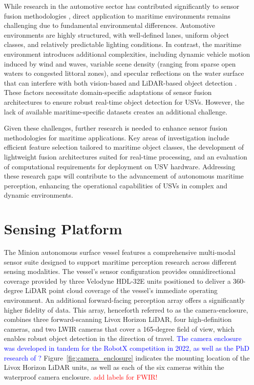 \documentclass{erauthesis}
\begin{document}
While research in the automotive sector has contributed significantly to sensor fusion methodologies \cite{yeong2021,clunie2021,roriz2022,cui2022,das2022,liu2023a}, direct application to maritime environments remains challenging due to fundamental environmental differences. 
Automotive environments are highly structured, with well-defined lanes, uniform object classes, and relatively predictable lighting conditions. 
In contrast, the maritime environment introduces additional complexities, including dynamic vehicle motion induced by wind and waves, variable scene density (ranging from sparse open waters to congested littoral zones), and specular reflections on the water surface that can interfere with both vision-based \cite{liu2023a} and \ac{LiDAR}-based object detection \cite{ahmed2024}.%
These factors necessitate domain-specific adaptations of sensor fusion architectures to ensure robust real-time object detection for \acp{USV}. 
However, the lack of available maritime-specific datasets \cite{jun-hwa2022,su2023,thompson2023} creates an additional challenge.

Given these challenges, further research is needed to enhance sensor fusion methodologies for maritime applications. 
Key areas of investigation include efficient feature selection tailored to maritime object classes, the development of lightweight fusion architectures suited for real-time processing, and an evaluation of computational requirements for deployment on \ac{USV} hardware. 
Addressing these research gaps will contribute to the advancement of autonomous maritime perception, enhancing the operational capabilities of \acp{USV} in complex and dynamic environments.

\chapter{Sensing Platform}


The Minion autonomous surface vessel features a comprehensive multi-modal sensor suite designed to support maritime perception research across different sensing modalities.
The vessel's sensor configuration provides omnidirectional coverage provided by three Velodyne HDL-32E units positioned to deliver a 360-degree \ac{LiDAR} point cloud coverage of the vessel's immediate operating environment.
An additional forward-facing perception array offers a significantly higher fidelity of data.
This array, henceforth referred to as the camera-enclosure, combines three forward-scanning Livox Horizon \ac{LiDAR}, four high-definition cameras, and two \ac{LWIR} cameras that cover a 165-degree field of view, which enables robust object detection in the direction of travel.
\textcolor{blue}{The camera enclosure was developed in tandem for the RobotX competition in 2022, as well as the PhD research of \cite{thompson2023}?}
Figure~\ref{fig:camera_enclosure} indicates the mounting location of the Livox Horizon LiDAR units, as well as each of the six cameras within the waterproof camera enclosure. 
\textcolor{red}{add labels for FWIR!}
\end{document}
